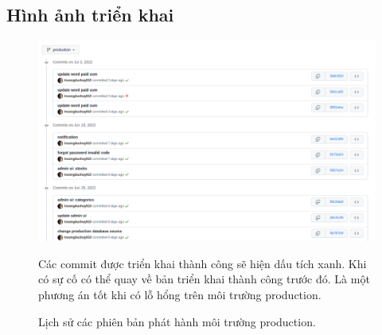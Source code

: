 \subsection{Hình ảnh triển khai}
\FloatBarrier
\begin{figure}[!htbp]\fontsize{13px}{13px}\selectfont
\centering
		\includegraphics[width=\textwidth]{./results/commit}
		\caption{Lịch sử các phiên bản phát hành môi trường \gls{production}.}
\justifying
Các commit được triển khai thành công sẽ hiện dấu tích xanh. Khi có sự cố có thể quay về bản triển khai thành công trước đó. Là một phương án tốt khi có lỗ hổng trên môi trường \gls{production}.
	
\end{figure}
\clearpage
\FloatBarrier
